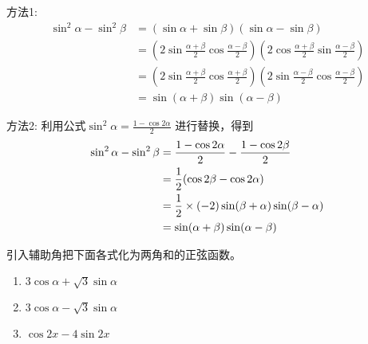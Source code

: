 \begin{solution}
方法1:
\[\begin{split}
    \sin^2\alpha-\sin^2\beta&=(\sin\alpha+\sin\beta)(\sin\alpha-\sin\beta)\\
    &=\left(2\sin\frac{\alpha+\beta}{2}\cos\frac{\alpha-\beta}{2}\right)\left(2\cos\frac{\alpha+\beta}{2}\sin\frac{\alpha-\beta}{2}\right)\\
    &=\left(2\sin\frac{\alpha+\beta}{2}\cos\frac{\alpha+\beta}{2}\right)\left(2\sin\frac{\alpha-\beta}{2}\cos\frac{\alpha-\beta}{2}\right)\\
    &=\sin(\alpha+\beta)\sin(\alpha-\beta)
\end{split}\]

方法2: 利用公式$\sin^2\alpha=\frac{1-\cos2\alpha}{2}$
进行替换，得到
\[\begin{split}
    \sin^2\alpha-\sin^2\beta&=\dfrac{1-\cos2\alpha}{2}-\dfrac{1-\cos2\beta}{2}\\
    &=\dfrac{1}{2}(\cos2\beta-\cos2\alpha)\\
    &=\dfrac{1}{2}\times (-2)\sin(\beta+\alpha)\sin(\beta-\alpha)\\
    &=\sin(\alpha+\beta)\sin(\alpha-\beta)
\end{split}\]
\end{solution}


\begin{example}
    引入辅助角把下面各式化为两角和的正弦函数。
\begin{enumerate}
    \item $3\cos\alpha+\sqrt{3}\sin\alpha$
    \item $3\cos\alpha-\sqrt{3}\sin\alpha$
    \item $\cos 2x-4\sin 2x$
\end{enumerate}
\end{example}

